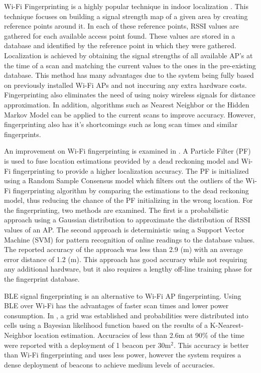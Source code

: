 \documentclass[conference]{IEEEtran}
\begin{document}
Wi-Fi Fingerprinting is a highly popular technique in indoor localization \cite{chan2012indoor,navarro2010wi}. This technique focuses on  building a signal strength map of a given area by creating reference points around it. In each of these reference points, RSSI values are gathered for each available access point found. These values are stored in a database and identified by the reference point in which they were gathered. Localization is achieved by obtaining the signal strengths of all available AP’s at the time of a scan and matching the current values to the ones in the pre-existing database. This method has many advantages due to the system being fully based on previously installed Wi-Fi APs and not inccuring any extra hardware costs. Fingerprinting also eliminates the need of using noisy wireless signals for distance approximation. In addition, algorithms such as Nearest Neighbor or the Hidden Markov Model can be applied to the current scans to improve accuracy. However, fingerprinting also has it’s shortcomings such as long scan times and similar fingerprints.

An improvement on  Wi-Fi fingerprinting is examined in \cite{wu2016improved}.  A Particle Filter (PF) is used to fuse location estimations provided by a dead reckoning model and Wi-Fi fingerprinting to provide a higher localization accuracy. The PF is initialized using a Random Sample Consensus model which filters out the outliers of the Wi-Fi fingerprinting algorithm by comparing the estimations to the dead reckoning model, thus reducing the chance of the PF initializing in the wrong location. For the fingerprinting, two methods are examined. The first is a probabilistic approach using a Gaussian distribution to approximate the distribution of RSSI values of an AP. The second approach is deterministic using a Support Vector Machine (SVM) for pattern recognition of online readings to the database values.  The reported accuracy of the approach was less than 2.9 (m) with an average error distance of 1.2 (m). This approach has good accuracy while not requiring any additional hardware, but it also requires a lengthy off-line training phase for the fingerprint database.

BLE signal fingerprinting is an alternative to Wi-Fi AP fingerprinting. Using BLE over Wi-Fi has the advantages of faster scan times and lower power consumption. In \cite{faragher2015location}, a grid was established and probabilities were distributed into cells using a Bayesian likelihood function based on the results of a K-Nearest-Neighbor location estimation. Accuracies of less than 2.6m at 90\% of the time were reported with a deployment of 1 beacon per 30m$^2$. This accuracy is better than Wi-Fi fingerprinting and uses less power, however the  system  requires a dense deployment of beacons to achieve medium levels of accuracies.
\end{document}
